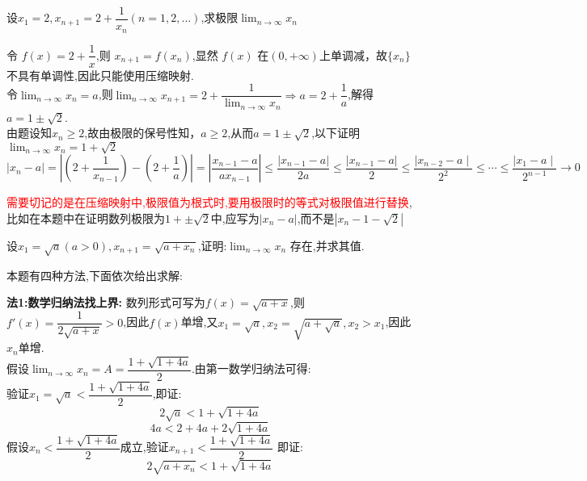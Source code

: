 \documentclass[8pt a4paper, oneside, UTF8]{ctexbook}
\begin{document}
\begin{sloppypar}
\begin{note}
\begin{solution}
        \end{solution}
    \end{note}
    \begin{problem}
        设$x_1=2,x_{n+1}=2+\dfrac1{x_n}(n=1,2,...)$,求极限$\lim_{n\to\infty}x_n$
    \end{problem}
    \begin{solution}
        令 $f(x)=2+\dfrac1x$,则 $x_{n+1}=f(x_n)$,显然 $f(x)$ 在$(0,+\infty)$上单调减，故$\{x_n\}$不具有单调性,因此只能使用压缩映射.\\
        令$\lim_{n\to \infty}x_n=a$,则$\lim_{n \to \infty}x_{n+1}=2+\dfrac{1}{\lim_{n\to \infty}x_n} \Rightarrow a=2+\dfrac{1}{a}$,解得$a=1\pm \sqrt{2}$.\\
        由题设知$x_n\geq2$,故由极限的保号性知，$a\geq2$,从而$a=1 \pm \sqrt{2}$,以下证明$\lim_{n\to \infty}x_n=1+\sqrt{2}$\\
        $\mid x_n-a\mid=\left|\left(2+\dfrac{1}{x_{n-1}}\right)-\left(2+\dfrac{1}{a}\right)\right|=\left|\dfrac{x_{n-1}-a}{ax_{n-1}}\right|\leqslant\dfrac{\left|x_{n-1}-a\right|}{2a}\leqslant\dfrac{\left|x_{n-1}-a\right|}{2} \leqslant \dfrac{\mid x_{n-2}-a\mid}{2^2} \leqslant \cdots \leqslant \dfrac{\mid x_1-a\mid}{2^{n-1}}\to0$
    \end{solution}
    \begin{note}
        \textcolor{red}{需要切记的是在压缩映射中,极限值为根式时,要用极限时的等式对极限值进行替换},比如在本题中在证明数列极限为$1+\pm \sqrt{2}$中,应写为$|x_n -a|$,而不是$|x_n -1 -\sqrt{2}|$
    \end{note}
    \begin{problem}
        设$x_1=\sqrt{a}(a>0),x_{n+1}=\sqrt{a+x_n}$,证明:$\lim_{n\to\infty} x_n$ 存在,并求其值.
    \end{problem}
        本题有四种方法,下面依次给出求解:
        \begin{solution}{\textbf{法1:数学归纳法找上界:}}
            数列形式可写为$f(x)=\sqrt{a+x}$,则$f'(x)=\dfrac{1}{2\sqrt{a+x}}>0$,因此$f(x)$单增,又$x_1=\sqrt{a},x_2=\sqrt{a+\sqrt{a}},x_2>x_1$,因此$x_n$单增.\\
            假设$\lim_{n\to \infty}x_n=A=\dfrac{1+\sqrt{1+4a}}{2}$.由第一数学归纳法可得:\\
            验证$x_1=\sqrt{a}<\dfrac{1+\sqrt{1+4a}}{2}$,即证:$$
                2\sqrt{a}<1+\sqrt{1+4a}
            $$
            $$
                4a<2+4a+2\sqrt{1+4a}
            $$
            假设$x_n<\dfrac{1+\sqrt{1+4a}}{2}$成立,验证$x_{n+1}<\dfrac{1+\sqrt{1+4a}}{2}$
            即证:$$
                2\sqrt{a+x_n}<1+\sqrt{1+4a}
$$
\end{solution}
\end{sloppypar}
\end{document}
